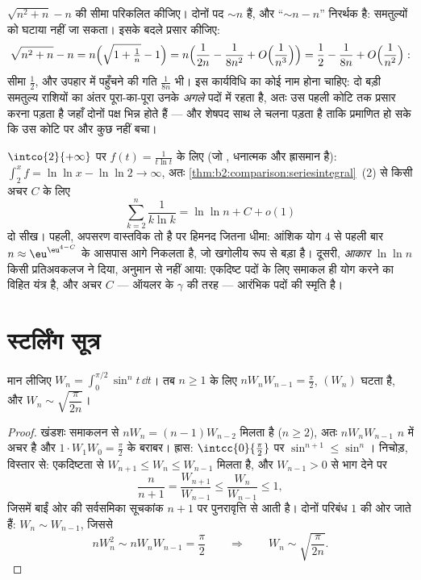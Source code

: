 \begin{example}[निरसन प्रसार माँगता है]\label{ex:b2:comparison:cancellation}
$\sqrt{n^2 + n} - n$ की सीमा परिकलित कीजिए। दोनों पद $\sim n$ हैं, और ``$\sim n - n$'' निरर्थक है:
समतुल्यों को घटाया नहीं जा सकता। इसके बदले प्रसार कीजिए:
\[
\sqrt{n^2 + n} - n
= n\Bigl(\sqrt{1 + \tfrac1n} - 1\Bigr)
= n\Bigl(\frac{1}{2n} - \frac{1}{8n^2} +
O\Bigl(\frac1{n^3}\Bigr)\Bigr)
= \frac12 - \frac{1}{8n} + O\Bigl(\frac1{n^2}\Bigr) :
\]
सीमा $\frac12$, और उपहार में पहुँचने की गति $\frac1{8n}$ भी। इस कार्यविधि का कोई नाम
होना चाहिए: दो बड़ी समतुल्य राशियों का अंतर पूरा-का-पूरा उनके \emph{अगले}
पदों में रहता है, अतः उस पहली कोटि तक प्रसार करना पड़ता है जहाँ दोनों
पक्ष भिन्न होते हैं --- और शेषपद साथ ले चलना पड़ता है ताकि प्रमाणित हो
सके कि उस कोटि पर और कुछ नहीं बचा।
\end{example}

\begin{example}[एक अपसारी तुलना, कर के दिखाई गई]\label{ex:b2:comparison:loglog}
$\intco{2}{+\infty}$ पर $f(t) = \frac{1}{t\ln t}$ के लिए (जो , धनात्मक और ह्रासमान है): $\int_2^x f = \ln\ln x -
\ln\ln 2 \to \infty$, अतः \cref{thm:b2:comparison:seriesintegral}~(2)
से किसी अचर $C$ के लिए
\[
\sum_{k=2}^{n}\frac{1}{k\ln k} = \ln\ln n + C + o(1)
\]
दो सीख। पहली, अपसरण वास्तविक तो है पर हिमनद जितना धीमा: आंशिक योग $4$
से पहली बार $n
\approx \eu^{\eu^{4 - C}}$ के आसपास आगे निकलता है, जो खगोलीय रूप से बड़ा है।
दूसरी, \emph{आकार} $\ln\ln n$ किसी प्रतिअवकलज ने दिया, अनुमान से नहीं आया:
एकदिष्ट पदों के लिए समाकल ही योग करने का विहित यंत्र है, और अचर $C$ ---
ऑयलर के $\gamma$ की तरह --- आरंभिक पदों की स्मृति है।
\end{example}

\section{स्टर्लिंग सूत्र}

\begin{lemma}[वालिस समाकल, पुनरावलोकन]\label{lem:b2:comparison:wallis}
मान लीजिए $W_n = \int_0^{\pi/2} \sin^n t\,\dd t$। तब $n \geq 1$ के लिए $nW_nW_{n-1} =
\frac\pi2$, $(W_n)$ घटता है, और $W_n \sim
\sqrt{\dfrac{\pi}{2n}}$।
\end{lemma}

\begin{proof}
खंडशः समाकलन से $nW_n = (n-1)W_{n-2}$ मिलता है ($n \geq 2$), अतः $nW_nW_{n-1}$ $n$ में अचर है और $1 \cdot W_1 W_0 =
\frac\pi2$ के
बराबर। ह्रास: $\intcc{0}{\frac\pi2}$ पर $\sin^{n+1} \leq \sin^n$। निचोड़, विस्तार से: एकदिष्टता से $W_{n+1} \leq W_n \leq W_{n-1}$ मिलता है,
और $W_{n-1}
> 0$ से भाग देने पर
\[
\frac{n}{n+1} = \frac{W_{n+1}}{W_{n-1}} \leq
\frac{W_n}{W_{n-1}} \leq 1 ,
\]
जिसमें बाईं ओर की सर्वसमिका सूचकांक $n + 1$ पर पुनरावृत्ति से आती है। दोनों
परिबंध $1$ की ओर जाते हैं: $W_n \sim W_{n-1}$, जिससे
\[
nW_n^2 \sim nW_nW_{n-1} = \frac\pi2
\qquad\Longrightarrow\qquad
W_n \sim \sqrt{\frac{\pi}{2n}} .
\]
\end{proof}

